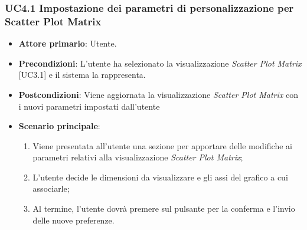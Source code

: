 \subsubsection{UC4.1 Impostazione dei parametri di personalizzazione per Scatter Plot Matrix}
\begin{itemize}
	\item \textbf{Attore primario}: Utente.
	\item \textbf{Precondizioni}: L'utente ha selezionato la visualizzazione \textit{Scatter Plot Matrix} [UC3.1] e il sistema la rappresenta.
	\item \textbf{Postcondizioni}: Viene aggiornata la visualizzazione \textit{Scatter Plot Matrix} con i nuovi parametri impostati dall'utente
	\item \textbf{Scenario principale}:
	\begin{enumerate}
			\item Viene presentata all'utente una sezione per apportare delle modifiche ai parametri relativi alla visualizzazione \textit{Scatter Plot Matrix};
			\item L'utente decide le dimensioni da visualizzare e gli assi del grafico a cui associarle;
			\item Al termine, l'utente dovrà premere sul pulsante per la conferma e l'invio delle nuove preferenze.
		\end{enumerate}
\end{itemize}